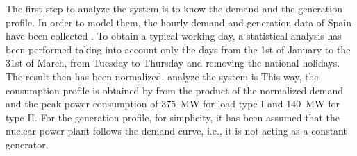 The first step to analyze the system is to know the demand and the generation profile. In order to model them, the hourly demand and generation data of Spain have been collected \cite{esios}. To obtain a typical working day, a statistical analysis has been performed taking into account only the days from the 1st of January to the 31st of March, from Tuesday to Thursday and removing the national holidays. The result then has been normalized. analyze the system is This way, the consumption profile is obtained by from the product of the normalized demand and the peak power consumption of 375~MW for load type I and 140~MW for type II. For the generation profile, for simplicity, it has been assumed that the nuclear power plant follows the demand curve, i.e., it is not acting as a constant generator.





